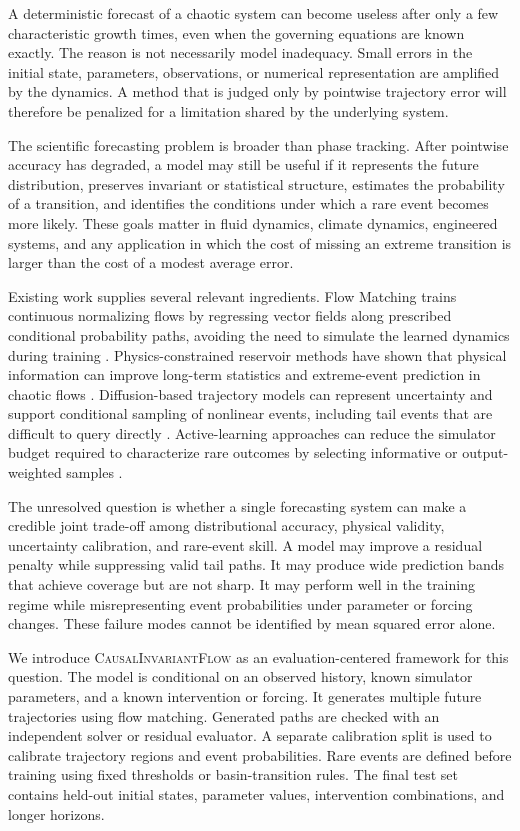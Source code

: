 \documentclass[11pt]{article}
\newcommand{\method}{\textsc{CausalInvariantFlow}}
\begin{document}
A deterministic forecast of a chaotic system can become useless after only a few characteristic growth times, even when the governing equations are known exactly. The reason is not necessarily model inadequacy. Small errors in the initial state, parameters, observations, or numerical representation are amplified by the dynamics. A method that is judged only by pointwise trajectory error will therefore be penalized for a limitation shared by the underlying system.

The scientific forecasting problem is broader than phase tracking. After pointwise accuracy has degraded, a model may still be useful if it represents the future distribution, preserves invariant or statistical structure, estimates the probability of a transition, and identifies the conditions under which a rare event becomes more likely. These goals matter in fluid dynamics, climate dynamics, engineered systems, and any application in which the cost of missing an extreme transition is larger than the cost of a modest average error.

Existing work supplies several relevant ingredients. Flow Matching trains continuous normalizing flows by regressing vector fields along prescribed conditional probability paths, avoiding the need to simulate the learned dynamics during training \cite{lipman2023flow}. Physics-constrained reservoir methods have shown that physical information can improve long-term statistics and extreme-event prediction in chaotic flows \cite{brunton2021physics}. Diffusion-based trajectory models can represent uncertainty and support conditional sampling of nonlinear events, including tail events that are difficult to query directly \cite{mora2023events}. Active-learning approaches can reduce the simulator budget required to characterize rare outcomes by selecting informative or output-weighted samples \cite{shayesteh2023extreme}.

The unresolved question is whether a single forecasting system can make a credible joint trade-off among distributional accuracy, physical validity, uncertainty calibration, and rare-event skill. A model may improve a residual penalty while suppressing valid tail paths. It may produce wide prediction bands that achieve coverage but are not sharp. It may perform well in the training regime while misrepresenting event probabilities under parameter or forcing changes. These failure modes cannot be identified by mean squared error alone.

We introduce \method{} as an evaluation-centered framework for this question. The model is conditional on an observed history, known simulator parameters, and a known intervention or forcing. It generates multiple future trajectories using flow matching. Generated paths are checked with an independent solver or residual evaluator. A separate calibration split is used to calibrate trajectory regions and event probabilities. Rare events are defined before training using fixed thresholds or basin-transition rules. The final test set contains held-out initial states, parameter values, intervention combinations, and longer horizons.
\end{document}
